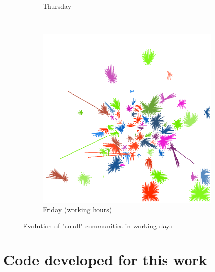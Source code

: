 \documentclass[12pt,a4paper]{article}
\begin{document}
\begin{figure}[H]
\begin{subfigure}[b]{0.48\textwidth}
\caption{Thursday}
\end{subfigure}
\\
\begin{subfigure}[b]{0.48\textwidth}
\includegraphics[width=\textwidth]{weekDef/edges-5Fri-small.png}
\caption{Friday (working hours)}
\end{subfigure}

\caption{Evolution of "small" communities in working days}
\end{figure}
\newpage

\section{Code developed for this work}
\end{document}
